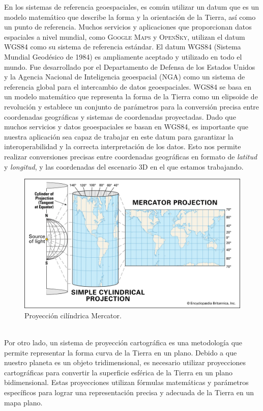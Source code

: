 \documentclass[a4paper, 11pt]{book}
\begin{document}
En los sistemas de referencia geoespaciales, es común utilizar un datum que es un modelo matemático que describe la forma y la orientación de la Tierra, así como un punto de referencia. Muchos servicios y aplicaciones que proporcionan datos espaciales a nivel mundial, como \textsc{Google Maps} y \textsc{OpenSky}, utilizan el datum \textsc{WGS84} como su sistema de referencia estándar.
El datum \textsc{WGS84} (Sistema Mundial Geodésico de 1984) es ampliamente aceptado y utilizado en todo el mundo. Fue desarrollado por el Departamento de Defensa de los Estados Unidos y la Agencia Nacional de Inteligencia \gls{geoespacial} (\textsc{NGA}) como un sistema de referencia global para el intercambio de datos geoespaciales.
\textsc{WGS84} se basa en un modelo matemático que representa la forma de la Tierra como un elipsoide de revolución y establece un conjunto de parámetros para la conversión precisa entre coordenadas geográficas y sistemas de coordenadas proyectadas.
Dado que muchos servicios y datos geoespaciales se basan en \textsc{WGS84}, es importante que nuestra aplicación sea capaz de trabajar en este datum para garantizar la interoperabilidad y la correcta interpretación de los datos. Esto nos permite realizar conversiones precisas entre coordenadas geográficas en formato de \emph{latitud} y \emph{longitud}, y las coordenadas del escenario \textsc{3D} en el que estamos trabajando.
\begin{figure}[h]
	\centering
	\includegraphics[width=12cm, keepaspectratio]{img/simple-cylindrical-projection-earth-map-globe-mercator.jpg}
	\caption{Proyección cilíndrica Mercator.}
	\label{fig:mercator}
\end{figure}
\\Por otro lado, un sistema de proyección cartográfica es una metodología que permite representar la forma curva de la Tierra en un plano. Debido a que nuestro planeta es un objeto tridimensional, es necesario utilizar proyecciones cartográficas para convertir la superficie esférica de la Tierra en un plano bidimensional. Estas proyecciones utilizan fórmulas matemáticas y parámetros específicos para lograr una representación precisa y adecuada de la Tierra en un mapa plano.
\end{document}
